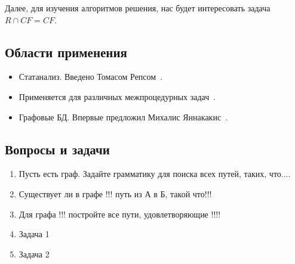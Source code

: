 Далее, для изучения алгоритмов решения, нас будет интересовать задача $R \cap CF = CF$.

\subsection{Области применения}
\begin{itemize}
	\item Статанализ. 
	Введено Томасом Репсом~\cite{Reps}.
	\item Применяется для различных межпроцедурных задач~\cite{LabelFlowCFLReachability,specificationCFLReachability,Zheng}.
	
	\item Графовые БД.
	Впервые предложил Михалис Яннакакис~\cite{Yannakakis}.
	
\end{itemize}

\subsection{Вопросы и задачи}
\begin{enumerate}
	\item Пусть есть граф. Задайте грамматику для поиска всех путей, таких, что....
	\item Существует ли в графе !!! путь из А в Б, такой что!!!
	\item Для графа !!! постройте все пути, удовлетворяющие !!!!
	
	\item Задача 1
	\item Задача 2
\end{enumerate}
